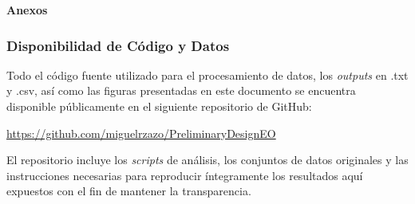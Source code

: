 \appendix

\clearpage
\thispagestyle{empty} 
\vspace*{\fill}
\begin{center}
    \Huge \textbf{Anexos}
\end{center}
\vspace*{\fill}
\clearpage


\setcounter{page}{1}

\subsubsection{Disponibilidad de Código y Datos}
Todo el código fuente utilizado para el procesamiento de datos, los \textit{outputs} en .txt y .csv, así como las figuras presentadas en este documento se encuentra disponible públicamente en el siguiente repositorio de GitHub:

\begin{center}
    \url{https://github.com/miguelrzazo/PreliminaryDesignEO}
\end{center}

El repositorio incluye los \textit{scripts} de análisis, los conjuntos de datos originales y las instrucciones necesarias para reproducir íntegramente los resultados aquí expuestos con el fin de mantener la transparencia.

\newpage
\label{sec:annexdata}

\label{sec:annexcode}
